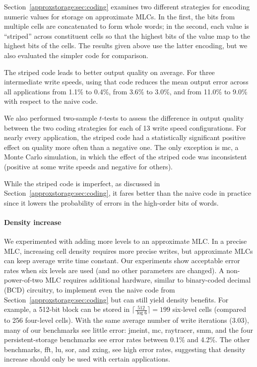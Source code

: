 Section~\ref{approxstorage:sec:coding} examines two different strategies for encoding
numeric values for storage on approximate MLCs. In the first, the bits from
multiple cells are concatenated to form whole words; in the second, each value
is ``striped'' across constituent cells so that the highest bits of the value
map to the highest bits of the cells. The results given above use
the latter encoding, but we also evaluated the simpler code for comparison.

The striped code leads to better output quality on average.
For three intermediate write speeds, using that code reduces the mean
output error across all applications from 1.1\% to 0.4\%, from 3.6\% to 3.0\%,
and from 11.0\% to 9.0\% with respect to the naive code.

We also
performed two-sample $t$-tests to assess the difference in output quality
between the two coding strategies for each of 13 write speed
configurations. For nearly every application, the striped code had a
statistically significant positive effect on quality more often than a
negative one. The only exception is \textsf{mc}, a Monte Carlo simulation, in
which the effect of the striped code was inconsistent (positive at some write
speeds and negative for others). 

While the striped code is imperfect, as
discussed in Section~\ref{approxstorage:sec:coding}, it fares better than the naive code in
practice since it lowers the probability of errors in the high-order bits of
words.


\paragraph{Density increase}

We experimented with adding more levels to an approximate MLC.
In a precise MLC, increasing
cell density requires more precise writes, but
approximate MLCs
can keep average write time
constant.
Our experiments show acceptable error rates when six levels are used (and no
other parameters are changed).
A non-power-of-two MLC requires additional hardware,
similar to binary-coded decimal (BCD) circuitry, to implement even the naive
code from Section~\ref{approxstorage:sec:coding} but can
still yield density benefits. For example, a 512-bit block can be stored in
$\lceil \frac{512}{\log 6} \rceil = 199$
six-level cells (compared to 256 four-level cells). With the same average number of
write iterations (3.03), many of our benchmarks
see little error: \textsf{jmeint}, \textsf{mc}, \textsf{raytracer},
\textsf{smm}, and the four persistent-storage benchmarks see error rates between
0.1\% and 4.2\%.
The other benchmarks, \textsf{fft}, \textsf{lu},
\textsf{sor}, and \textsf{zxing}, see high error rates, suggesting that
density increase should only be used with certain applications.

